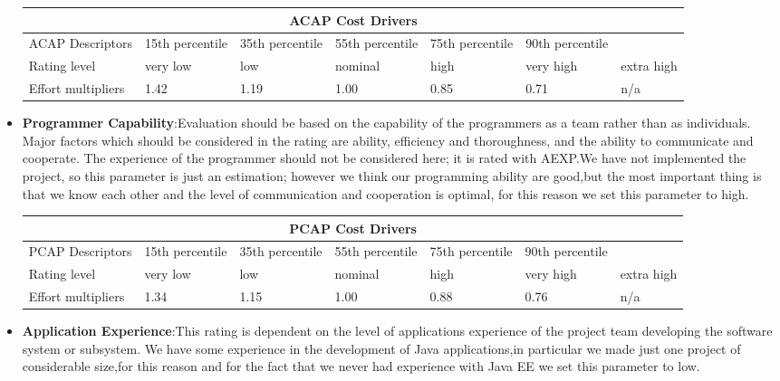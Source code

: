 \begin{itemize}
\begin{longtable}{| m{}| m{} | m{} | m{} | m{} | m{} | m{}| }
\hline
\multicolumn{7}{c}{ACAP Cost Drivers}\\
\hline
\hline
ACAP Descriptors & 15th percentile  & 35th percentile & 55th percentile & 75th percentile & 90th percentile & \\
\hline
Rating level & very low & low & nominal & high & very high & extra high \\
\hline
Effort multipliers & 1.42 & 1.19 & 1.00 & 0.85 & 0.71 & n/a \\
\hline
\end{longtable}

\item \textbf{Programmer Capability}:Evaluation should be based on the capability of the programmers as a team rather than as individuals. Major factors which should be considered in the rating are ability, efficiency and thoroughness, and the ability to communicate and cooperate. The experience of the programmer should not be considered here; it is rated with AEXP.We have not implemented the project, so this parameter is just an estimation; however we think our programming ability are good,but the most important thing is that we know each other and the level of communication and cooperation is optimal, for this reason we set this parameter to high.

\begin{longtable}{| m{}| m{} | m{} | m{} | m{} | m{} | m{}| }
\hline
\multicolumn{7}{c}{PCAP Cost Drivers}\\
\hline
\hline
PCAP Descriptors & 15th percentile  & 35th percentile & 55th percentile & 75th percentile & 90th percentile & \\
\hline
Rating level & very low & low & nominal & high & very high & extra high \\
\hline
Effort multipliers & 1.34 & 1.15 & 1.00 & 0.88 & 0.76 & n/a \\
\hline
\end{longtable}

\item\textbf{Application Experience}:This rating is dependent on the level of applications experience of the project team developing the software system or subsystem. We have some experience in the development of Java applications,in particular we made just one project of considerable size,for this reason and for the fact that we never had experience with Java EE we set this parameter to low.


\end{itemize}
